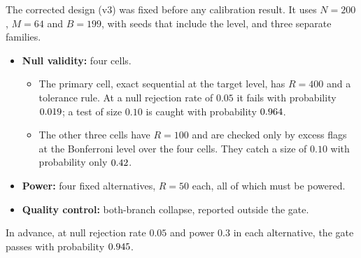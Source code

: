 \documentclass{article}
\theoremstyle{plain}
\theoremstyle{definition}
\theoremstyle{remark}
\newcommand{\E}{\mathbb{E}}
\begin{document}
The corrected design (v3) was fixed before any calibration result. It uses $N=200$, $M=64$ and $B=199$, with seeds that include the level, and three separate families.
\begin{itemize}
\item \textbf{Null validity:} four cells.
  \begin{itemize}
  \item The primary cell, exact sequential at the target level, has $R=400$ and a tolerance rule. At a null rejection rate of $0.05$ it fails with probability $0.019$; a test of size $0.10$ is caught with probability $0.964$.
  \item The other three cells have $R=100$ and are checked only by excess flags at the Bonferroni level over the four cells. They catch a size of $0.10$ with probability only $0.42$.
  \end{itemize}
\item \textbf{Power:} four fixed alternatives, $R=50$ each, all of which must be powered.
\item \textbf{Quality control:} both-branch collapse, reported outside the gate.
\end{itemize}
In advance, at null rejection rate $0.05$ and power $0.3$ in each alternative, the gate passes with probability $0.945$.

\begin{table}[h]
\centering
\caption{Contract of the calibration cells (closed form, standardized scale). ``Changed'' compares the sequential with the direct branch; ``truth'' compares the sequential branch with the true conditional. $\E\,\Delta$CRPS is the expected CRPS excess over the true conditional.}
\label{tab:contract}
\scriptsize
\setlength{\tabcolsep}{2pt}

\end{table}
\end{document}
